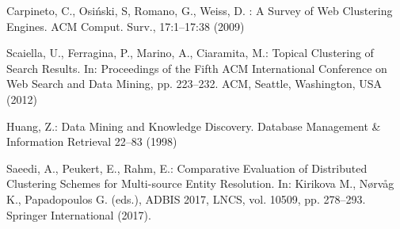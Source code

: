 \documentclass[runningheads]{llncs}
\begin{document}
\begin{thebibliography}{8}
Carpineto, C., Osi\'{n}ski, S, Romano, G., Weiss, D. : A Survey of Web Clustering Engines. ACM Comput. Surv., 17:1--17:38 (2009)

Scaiella, U., Ferragina, P., Marino, A., Ciaramita, M.: Topical Clustering of Search Results. In: Proceedings of the Fifth ACM International Conference on Web Search and Data Mining, pp. 223--232. ACM, Seattle, Washington, USA (2012) 

Huang, Z.: Data Mining and Knowledge Discovery. Database Management \& Information Retrieval 22--83 (1998)  

Saeedi, A., Peukert, E., Rahm, E.: Comparative Evaluation of Distributed Clustering Schemes for Multi-source Entity Resolution. In: Kirikova M., N\o rv\aa g K., Papadopoulos G. (eds.), ADBIS 2017, LNCS, vol. 10509, pp. 278--293. Springer International (2017). 

\end{thebibliography}

\begin{comment}
\bibitem{ref_lncs1}
Author, F., Author, S.: Title of a proceedings paper. In: Editor,
F., Editor, S. (eds.) CONFERENCE 2016, LNCS, vol. 9999, pp. 1--13.
Springer, Heidelberg (2016). \doi{10.10007/1234567890}

\bibitem{ref_article1}
Author, F.: Article title. Journal \textbf{2}(5), 99--110 (2016)

\bibitem{ref_book1}
Author, F., Author, S., Author, T.: Book title. 2nd edn. Publisher,
Location (1999)

\bibitem{ref_proc1}
Author, A.-B.: Contribution title. In: 9th International Proceedings
on Proceedings, pp. 1--2. Publisher, Location (2010)

\bibitem{ref_url1}
LNCS Homepage, \url{http://www.springer.com/lncs}. Last accessed 4
Oct 2017

\end{comment}
\end{document}
